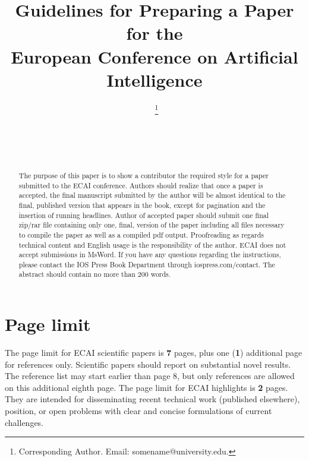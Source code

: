 \documentclass{ecai}  %
\begin{document}
\begin{frontmatter}

\title{Guidelines for Preparing a Paper for the \\
European Conference on Artificial Intelligence}

\author[A]{~\thanks{Corresponding Author. Email: somename@university.edu.}}
\author[B]{~}
\author[B]{~} %


\address[A]{Short Affiliation of First Author}
\address[B]{Short Affiliation of Second Author and Third Author}

\begin{abstract}
The purpose of this paper is to show a contributor the required style for a paper submitted to the ECAI conference.
Authors should realize that once a paper is accepted, the final manuscript submitted by the author will be almost
identical to the final, published version that appears in the book, except for pagination and the insertion of running headlines.
Author of accepted paper should submit one final zip/rar file containing only one, final, version of the paper
including all files necessary to compile the paper as well as a compiled pdf output. Proofreading as regards
technical content and English usage is the responsibility of the author. ECAI does not accept submissions in MsWord.
If you have any questions regarding the instructions, please contact the IOS Press Book Department through iospress.com/contact.
The abstract should contain no more than 200 words.
\end{abstract}

\end{frontmatter}

\section{Page limit}
%

The page limit for ECAI scientific papers is {\bf 7} pages, plus one ({\bf 1})
additional page for references only. Scientific papers should report on substantial novel results. The reference list may start earlier than page 8, but only references are allowed on this additional eighth page.
The page limit for ECAI highlights is {\bf 2} pages. They are intended for disseminating  recent technical work (published elsewhere), position, or open problems with clear and concise formulations of current challenges.
\end{document}
